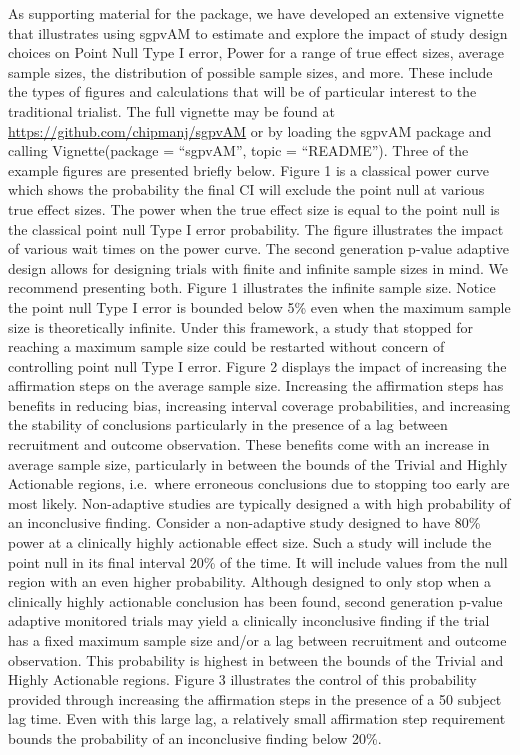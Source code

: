 \documentclass[12pt,oneside]{book}
\newlength{\li}\setlength{\li}{14.48pt}
\newlength{\di}\setlength{\di}{-3.5mm}
\theoremstyle{definition}
\theoremstyle{definition}
\theoremstyle{definition}
\theoremstyle{remark}
\begin{document}
As supporting material for the package, we have developed an extensive
vignette that illustrates using sgpvAM to estimate and explore the
impact of study design choices on Point Null Type I error, Power for a
range of true effect sizes, average sample sizes, the distribution of
possible sample sizes, and more. These include the types of figures and
calculations that will be of particular interest to the traditional
trialist. The full vignette may be found at
\url{https://github.com/chipmanj/sgpvAM} or by loading the sgpvAM
package and calling Vignette(package = ``sgpvAM'', topic = ``README'').
Three of the example figures are presented briefly below. Figure 1 is a
classical power curve which shows the probability the final CI will
exclude the point null at various true effect sizes. The power when the
true effect size is equal to the point null is the classical point null
Type I error probability. The figure illustrates the impact of various
wait times on the power curve. The second generation p-value adaptive
design allows for designing trials with finite and infinite sample sizes
in mind. We recommend presenting both. Figure 1 illustrates the infinite
sample size. Notice the point null Type I error is bounded below 5\%
even when the maximum sample size is theoretically infinite. Under this
framework, a study that stopped for reaching a maximum sample size could
be restarted without concern of controlling point null Type I error.
Figure 2 displays the impact of increasing the affirmation steps on the
average sample size. Increasing the affirmation steps has benefits in
reducing bias, increasing interval coverage probabilities, and
increasing the stability of conclusions particularly in the presence of
a lag between recruitment and outcome observation. These benefits come
with an increase in average sample size, particularly in between the
bounds of the Trivial and Highly Actionable regions, i.e.~where
erroneous conclusions due to stopping too early are most likely.
Non-adaptive studies are typically designed a with high probability of
an inconclusive finding. Consider a non-adaptive study designed to have
80\% power at a clinically highly actionable effect size. Such a study
will include the point null in its final interval 20\% of the time. It
will include values from the null region with an even higher
probability. Although designed to only stop when a clinically highly
actionable conclusion has been found, second generation p-value adaptive
monitored trials may yield a clinically inconclusive finding if the
trial has a fixed maximum sample size and/or a lag between recruitment
and outcome observation. This probability is highest in between the
bounds of the Trivial and Highly Actionable regions. Figure 3
illustrates the control of this probability provided through increasing
the affirmation steps in the presence of a 50 subject lag time. Even
with this large lag, a relatively small affirmation step requirement
bounds the probability of an inconclusive finding below 20\%.
\end{document}
